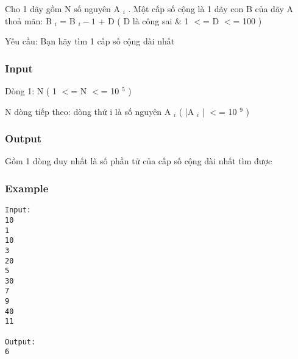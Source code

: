 



   Cho 1 dãy gồm N số nguyên  A   $_    i   $   . Một cấp số cộng là 1 dãy con B của dãy A thoả mãn: B   $_    i   $   =  B   $_    i-1   $   + D ( D là công sai \& 1 $<$= D $<$= 100 )  

   Yêu cầu: Bạn hãy tìm 1 cấp số cộng dài nhất  

\subsubsection{   Input  }

   Dòng 1: N ( 1 $<$= N $<$= 10   $^    5   $   )  

   N dòng tiếp theo: dòng thứ  i  là số nguyên  A   $_    i   $   ( |A   $_    i   $   | $<$= 10   $^    9   $   )  

\subsubsection{   Output  }

   Gồm 1 dòng duy nhất là số phần tử của cấp số cộng dài nhất tìm được  

\subsubsection{   Example  }
\begin{verbatim}
Input:
10
1
10
3
20
5
30
7
9
40
11

Output:
6
\end{verbatim}
